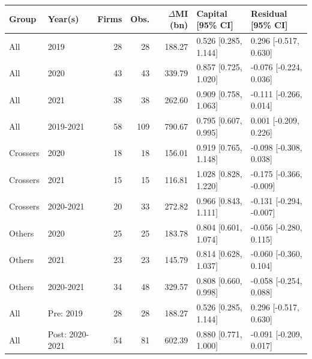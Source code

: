 \begingroup
\small
\setlength{\tabcolsep}{3pt}
\begin{tabular}{llrrrll}
\hline
Group & Year(s) & Firms & Obs. & $\Delta$MI (bn) & Capital [95\% CI] & Residual [95\% CI] \\
\hline
All & 2019 & 28 & 28 & 188.27 & 0.526 [0.285, 1.144] & 0.296 [-0.517, 0.630] \\
All & 2020 & 43 & 43 & 339.79 & 0.857 [0.725, 1.020] & -0.076 [-0.224, 0.036] \\
All & 2021 & 38 & 38 & 262.60 & 0.909 [0.758, 1.063] & -0.111 [-0.266, 0.014] \\
All & 2019-2021 & 58 & 109 & 790.67 & 0.795 [0.607, 0.995] & 0.001 [-0.209, 0.226] \\
Crossers & 2020 & 18 & 18 & 156.01 & 0.919 [0.765, 1.148] & -0.098 [-0.308, 0.038] \\
Crossers & 2021 & 15 & 15 & 116.81 & 1.028 [0.828, 1.220] & -0.175 [-0.366, -0.009] \\
Crossers & 2020-2021 & 20 & 33 & 272.82 & 0.966 [0.843, 1.111] & -0.131 [-0.294, -0.007] \\
Others & 2020 & 25 & 25 & 183.78 & 0.804 [0.601, 1.074] & -0.056 [-0.280, 0.115] \\
Others & 2021 & 23 & 23 & 145.79 & 0.814 [0.628, 1.037] & -0.060 [-0.360, 0.104] \\
Others & 2020-2021 & 34 & 48 & 329.57 & 0.808 [0.660, 0.998] & -0.058 [-0.254, 0.088] \\
All & Pre: 2019 & 28 & 28 & 188.27 & 0.526 [0.285, 1.144] & 0.296 [-0.517, 0.630] \\
All & Post: 2020-2021 & 54 & 81 & 602.39 & 0.880 [0.771, 1.000] & -0.091 [-0.209, 0.017] \\
\hline
\end{tabular}
\endgroup
